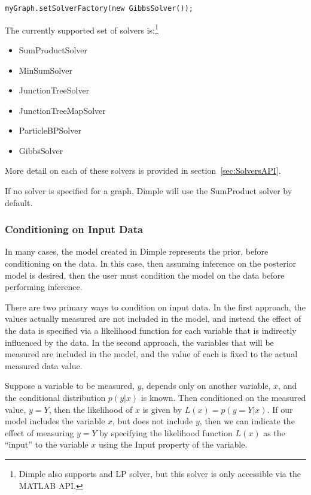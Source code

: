 \fi

\ifjava

\begin{lstlisting}
myGraph.setSolverFactory(new GibbsSolver());
\end{lstlisting}

The currently supported set of solvers is:\footnote{Dimple also supports and LP solver, but this solver is only accessible via the MATLAB API.}

\begin{itemize}
\item SumProductSolver
\item MinSumSolver
\item JunctionTreeSolver
\item JunctionTreeMapSolver
\item ParticleBPSolver
\item GibbsSolver
\end{itemize}

\fi

More detail on each of these solvers is provided in section~\ref{sec:SolversAPI}.

If no solver is specified for a graph, Dimple will use the SumProduct solver by default.


\subsubsection{Conditioning on Input Data}

In many cases, the model created in Dimple represents the prior, before conditioning on the data.  In this case, then assuming inference on the posterior model is desired, then the user must condition the model on the data before performing inference.

There are two primary ways to condition on input data.  In the first approach, the values actually measured are not included in the model, and instead the effect of the data is specified via a likelihood function for each variable that is indirectly influenced by the data.  In the second approach, the variables that will be measured are included in the model, and the value of each is fixed to the actual measured data value.

\label{sec:LikelihoodInput}

Suppose a variable to be measured, $y$, depends only on another variable, $x$, and the conditional distribution $p(y|x)$ is known.  Then conditioned on the measured value, $y = Y$, then the likelihood of $x$ is given by $L(x) = p(y = Y | x)$.  If our model includes the variable $x$, but does not include $y$, then we can indicate the effect of measuring $y = Y$ by specifying the likelihood function $L(x)$ as the ``input'' to the variable $x$ using the Input property of the variable.

